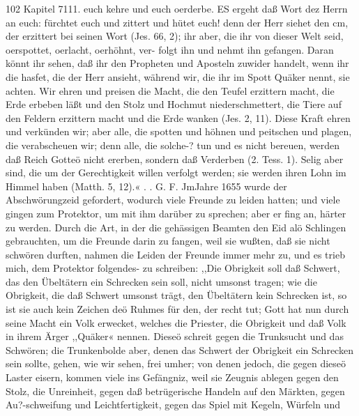 102 Kapitel 7111.
euch kehre und euch oerderbe. ES ergeht daß Wort dez Herrn
an euch: fürchtet euch und zittert und hütet euch! denn der Herr
siehet den cm, der erzittert bei seinen Wort (Jes. 66, 2); ihr aber,
die ihr von dieser Welt seid, oerspottet, oerlacht, oerhöhnt, ver-
folgt ihn und nehmt ihn gefangen. Daran könnt ihr sehen, daß
ihr den Propheten und Aposteln zuwider handelt, wenn ihr die hasfet,
die der Herr ansieht, während wir, die ihr im Spott Quäker
nennt, sie achten. Wir ehren und preisen die Macht, die den
Teufel erzittern macht, die Erde erbeben läßt und den Stolz und
Hochmut niederschmettert, die Tiere auf den Feldern erzittern
macht und die Erde wanken (Jes. 2, 11). Diese Kraft ehren
und verkünden wir; aber alle, die spotten und höhnen und
peitschen und plagen, die verabscheuen wir; denn alle, die solche-?
tun und es nicht bereuen, werden daß Reich Gotteö nicht ererben,
sondern daß Verderben (2. Tess. 1).
Selig aber sind, die um der Gerechtigkeit willen verfolgt
werden; sie werden ihren Lohn im Himmel haben (Matth. 5, 12).« . .
G. F.
JmJahre 1655 wurde der Abschwörungzeid gefordert, wodurch
viele Freunde zu leiden hatten; und viele gingen zum Protektor, um
mit ihm darüber zu sprechen; aber er fing an, härter zu werden.
Durch die Art, in der die gehässigen Beamten den Eid alö
Schlingen gebrauchten, um die Freunde darin zu fangen, weil sie
wußten, daß sie nicht schwören durften, nahmen die Leiden der
Freunde immer mehr zu, und es trieb mich, dem Protektor folgendes-
zu schreiben:
,,Die Obrigkeit soll daß Schwert, das den Übeltätern ein
Schrecken sein soll, nicht umsonst tragen; wie die Obrigkeit, die
daß Schwert umsonst trägt, den Übeltätern kein Schrecken ist, so
ist sie auch kein Zeichen deö Ruhmes für den, der recht tut;
Gott hat nun durch seine Macht ein Volk erwecket, welches
die Priester, die Obrigkeit und daß Volk in ihrem Ärger ,,Quäker«
nennen. Dieseö schreit gegen die Trunksucht und das Schwören;
die Trunkenbolde aber, denen das Schwert der Obrigkeit ein
Schrecken sein sollte, gehen, wie wir sehen, frei umher; von denen
jedoch, die gegen dieseö Laster eisern, kommen viele ins Gefängniz,
weil sie Zeugnis ablegen gegen den Stolz, die Unreinheit, gegen
daß betrügerische Handeln auf den Märkten, gegen Au?-schweifung
und Leichtfertigkeit, gegen das Spiel mit Kegeln, Würfeln und



